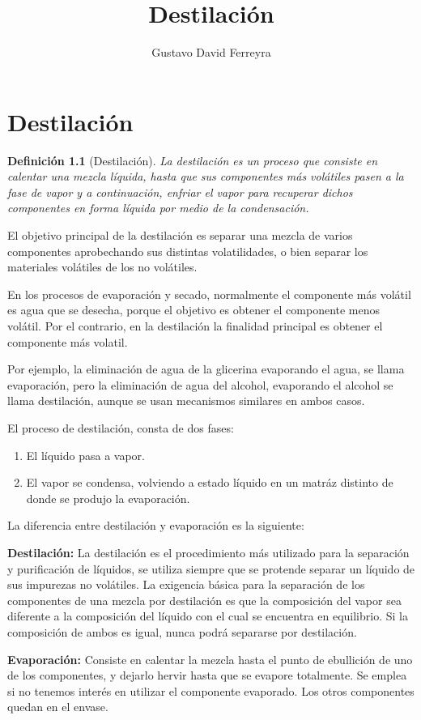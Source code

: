 \documentclass[11pt,openany]{book}
\title{Destilación}
\author{Gustavo David Ferreyra}
\newtheorem{defi}{Definición}
\begin{document}

\newpage\null\thispagestyle{empty}\newpage
\chapter{Destilación}
\begin{defi}[Destilación]
La destilación es un proceso que consiste en calentar una mezcla líquida, hasta que sus componentes más 
volátiles pasen a la fase de vapor y a continuación, enfriar el vapor para recuperar dichos 
componentes en forma líquida por medio de la condensación.
\end{defi}

El objetivo principal de la destilación es separar una mezcla de varios componentes aprobechando 
sus distintas volatilidades, o bien separar los materiales volátiles de los no volátiles.

En los procesos de evaporación y secado, normalmente el componente más volátil es agua que se desecha, porque el objetivo es obtener 
el componente menos volátil. Por el contrario, en la destilación la finalidad principal es obtener el componente más volatil.

Por ejemplo, la eliminación de agua de la glicerina evaporando el agua, se llama evaporación, pero 
la eliminación de agua del alcohol, evaporando el alcohol se llama destilación, aunque se usan 
mecanismos similares en ambos casos.

El proceso de destilación, consta de dos fases:
\begin{enumerate}
\item El líquido pasa a vapor. 
\item El vapor se condensa, volviendo a estado líquido en un matráz distinto de donde se produjo la evaporación.
\end{enumerate}
La diferencia entre destilación y evaporación es la siguiente:

\textbf{Destilación:} La destilación es el procedimiento más utilizado para la separación y purificación de 
líquidos, se utiliza siempre  que se protende separar un líquido de sus impurezas no volátiles.
La exigencia básica para la separación de los componentes de una mezcla por destilación es que la 
composición del vapor sea diferente a la composición del líquido con el cual se encuentra en equilibrio. Si 
la composición de ambos es igual, nunca podrá separarse por destilación.

\textbf{Evaporación:} Consiste en calentar la mezcla hasta el punto de ebullición de uno de los 
componentes, y dejarlo hervir hasta que se evapore totalmente. Se emplea si no tenemos interés 
en utilizar el componente evaporado. Los otros componentes quedan en el envase.
\end{document}
